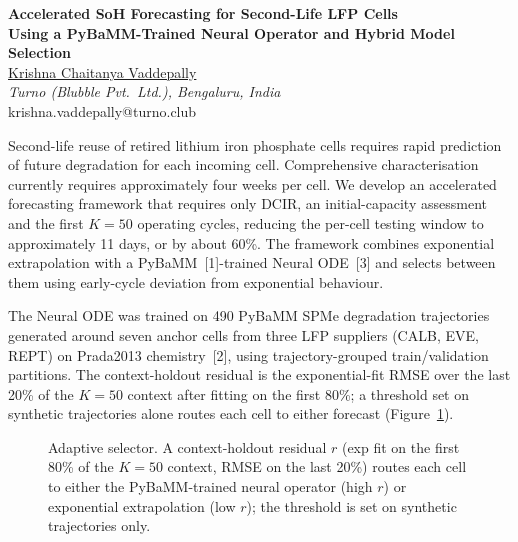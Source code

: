 \documentclass[12pt,a4paper]{article}
\begin{document}
\begin{center}
{\bfseries\large Accelerated SoH Forecasting for Second-Life LFP Cells\\
Using a PyBaMM-Trained Neural Operator and Hybrid Model Selection}\\[0.40em]
\underline{Krishna Chaitanya Vaddepally}\\
\emph{Turno (Blubble Pvt.\ Ltd.), Bengaluru, India}\\
krishna.vaddepally@turno.club
\end{center}

Second-life reuse of retired lithium iron phosphate cells requires rapid
prediction of future degradation for each incoming cell. Comprehensive
characterisation currently requires approximately four weeks per cell.
We develop an accelerated forecasting framework that requires only
DCIR, an initial-capacity assessment and the first $K{=}50$ operating
cycles, reducing the per-cell testing window to approximately 11 days,
or by about 60\%. The framework combines exponential extrapolation
with a PyBaMM~[1]-trained Neural ODE~[3] and selects between them using
early-cycle deviation from exponential behaviour.

The Neural ODE was trained on 490 PyBaMM SPMe degradation trajectories
generated around seven anchor cells from three LFP suppliers (CALB,
EVE, REPT) on Prada2013 chemistry~[2], using trajectory-grouped
train/validation partitions. The context-holdout residual is the
exponential-fit RMSE over the last 20\% of the $K{=}50$ context after
fitting on the first 80\%; a threshold set on synthetic trajectories
alone routes each cell to either forecast (Figure~\ref{fig:selector}).

\begin{figure}[H]
  \centering
  \caption{Adaptive selector. A context-holdout residual $r$ (exp fit on
  the first 80\% of the $K{=}50$ context, RMSE on the last 20\%) routes
  each cell to either the PyBaMM-trained neural operator (high $r$) or
  exponential extrapolation (low $r$); the threshold is set on
  synthetic trajectories only.}
  \label{fig:selector}
\end{figure}
\end{document}
